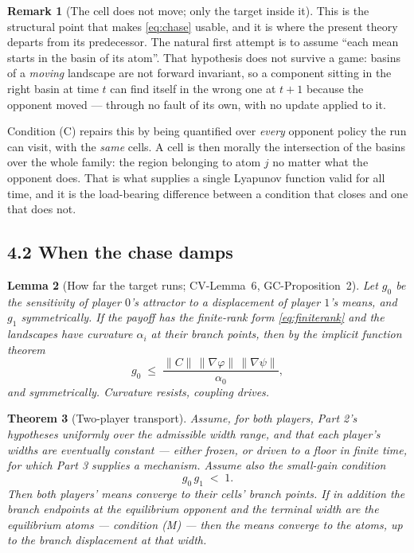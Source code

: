 \documentclass[11pt]{article}
\newtheorem{theorem}{Theorem}[section]
\newtheorem{lemma}[theorem]{Lemma}
\theoremstyle{definition}
\newtheorem{remark}[theorem]{Remark}
\newcommand{\GC}[1]{\textsf{GC-#1}}
\newcommand{\CV}[1]{\textsf{CV-#1}}
\begin{document}
\begin{remark}[The cell does not move; only the target inside it]\label{rem:fixed}
This is the structural point that makes \eqref{eq:chase} usable, and it is where
the present theory departs from its predecessor. The natural first attempt is to
assume ``each mean starts in the basin of its atom''. That hypothesis does not
survive a game: basins of a \emph{moving} landscape are not forward invariant, so
a component sitting in the right basin at time $t$ can find itself in the wrong
one at $t+1$ because the opponent moved --- through no fault of its own, with no
update applied to it.

Condition (C) repairs this by being quantified over \emph{every} opponent policy
the run can visit, with the \emph{same} cells. A cell is then morally the
intersection of the basins over the whole family: the region belonging to atom $j$
no matter what the opponent does. That is what supplies a single Lyapunov function
valid for all time, and it is the load-bearing difference between a condition that
closes and one that does not.
\end{remark}

\subsection*{4.2 When the chase damps}

\begin{lemma}[How far the target runs; \CV{Lemma~6}, \GC{Proposition~2}]
\label{lem:drift}
Let $g_0$ be the sensitivity of player $0$'s attractor to a displacement of
player $1$'s means, and $g_1$ symmetrically. If the payoff has the finite-rank
form \eqref{eq:finiterank} and the landscapes have curvature $\alpha_i$ at their
branch points, then by the implicit function theorem
\[
  g_0 \;\le\; \frac{\|C\|\,\|\nabla\varphi\|\,\|\nabla\psi\|}{\alpha_0},
\]
and symmetrically. \emph{Curvature resists, coupling drives.}
\end{lemma}

\begin{theorem}[Two-player transport]\label{thm:part4}
Assume, for both players, Part 2's hypotheses uniformly over the admissible width
range, and that each player's widths are \emph{eventually constant} --- either
frozen, or driven to a floor in finite time, for which Part 3 supplies a
mechanism. Assume also the \emph{small-gain condition}
\begin{equation}\label{eq:sg}
  g_0\,g_1 \;<\; 1 .
\end{equation}
Then both players' means converge to their cells' branch points. If in addition
the branch endpoints at the equilibrium opponent and the terminal width are the
equilibrium atoms --- condition (M) --- then the means converge to the atoms, up to
the branch displacement at that width.
\end{theorem}
\end{document}
